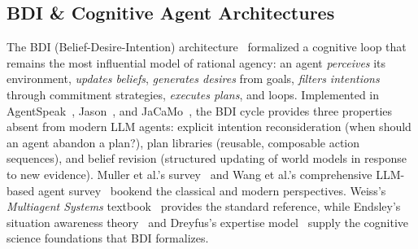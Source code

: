 \documentclass{article}
\begin{document}
\subsection{BDI \& Cognitive Agent Architectures}
\label{sec:p-bdi}

%
%
%
%
%
%

The BDI (Belief-Desire-Intention) architecture~\citep{rao1995bdi} formalized a cognitive
loop that remains the most influential model of rational agency: an agent \emph{perceives}
its environment, \emph{updates beliefs}, \emph{generates desires} from goals, \emph{filters
intentions} through commitment strategies, \emph{executes plans}, and loops. Implemented in
AgentSpeak~\citep{rao1996agentspeak}, Jason~\citep{bordini2007jason}, and
JaCaMo~\citep{boissier2013jacamo}, the BDI cycle provides three properties absent from
modern LLM agents: explicit intention reconsideration (when should an agent abandon a
plan?), plan libraries (reusable, composable action sequences), and belief revision
(structured updating of world models in response to new evidence). Muller et al.'s
survey~\citep{sutra76_agent1995} and Wang et al.'s comprehensive LLM-based agent
survey~\citep{sutra587_rise2023} bookend the classical and modern
perspectives. Weiss's \emph{Multiagent Systems}
textbook~\citep{sutra1369_multiagent2000} provides the standard reference, while
Endsley's situation awareness theory~\citep{sutra13783_theory1995} and Dreyfus's
expertise model~\citep{sutra13790_mind1987} supply the cognitive science foundations
that BDI formalizes.
\end{document}
